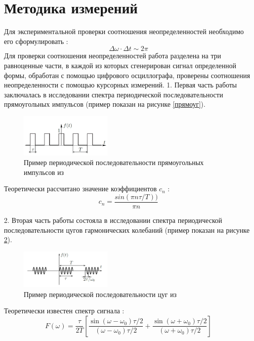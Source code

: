 \documentclass[a4paper,12pt]{article} %
\begin{document}
\section{Методика измерений}
Для экспериментальной проверки соотношения неопределенностей необходимо его сформулировать \cite{labnik}:
\begin{equation}
\Delta \omega \cdot \Delta t \sim 2\pi
\end{equation}
Для проверки соотношения неопределенностей работа разделена на три равноценные части, в каждой из которых сгенерирован сигнал определенной формы, обработан с помощью цифрового осциллографа, проверены соотношения неопределенности с помощью курсорных измерений.
1. Первая часть работы заключалась в исследовании спектра периодической последовательности прямоугольных импульсов (пример показан на рисунке \ref{прямоуг}). 
\begin{figure}[h!]
\includegraphics[width=0.4\textwidth]{rect}
\caption{Пример периодической последовательности прямоугольных импульсов из \cite{labnik}} \label{rect}
\end{figure}
Теоретически рассчитано значение коэффициентов $c_n$ \cite{labnik}:
\begin{equation}
c_n  = \dfrac{sin(\pi n \tau / T))}{\pi n}
\end{equation}

2. Вторая часть работы состояла в исследовании спектра периодической последовательности цугов гармонических колебаний (пример показан на рисунке \ref{цуги}). 
\begin{figure}[h!]
\begin{center}
\includegraphics[width=0.4\textwidth]{цуги}
\caption{Пример периодической последовательности цуг из \cite{labnik}} \label{цуги}
\end{center}
\end{figure}
Теоретически известен спектр сигнала \cite{labnik}: 
\begin{equation}
F(\omega) = \dfrac{\tau}{2T}\left[\dfrac{\sin(\omega-\omega_0)\tau /2}
{(\omega-\omega_0)\tau /2}
 + \dfrac{\sin(\omega+\omega_0)\tau /2}{(\omega+\omega_0)\tau /2}\right]
\end{equation}
\end{document}
